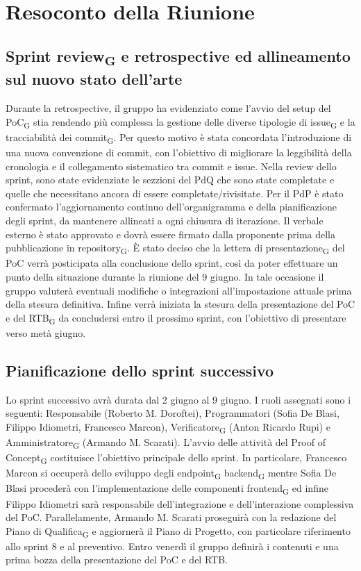\section{Resoconto della Riunione}

\subsection{Sprint review\textsubscript{G} e retrospective ed allineamento sul nuovo stato dell'arte}
Durante la retrospective, il gruppo ha evidenziato 
come l’avvio del setup del PoC\textsubscript{G} stia rendendo più complessa 
la gestione delle diverse tipologie di issue\textsubscript{G} e la 
tracciabilità dei commit\textsubscript{G}. 
Per questo motivo è stata concordata l’introduzione 
di una nuova convenzione di commit, 
con l’obiettivo di migliorare la leggibilità della 
cronologia e il collegamento sistematico tra commit e issue.
Nella review dello sprint,  sono state evidenziate 
le sezzioni del PdQ che sono state completate e 
quelle che necessitano ancora di essere completate/rivisitate. 
Per il PdP è stato confermato l’aggiornamento continuo 
dell’organigramma e della pianificazione degli sprint, 
da mantenere allineati a ogni chiusura di iterazione. 
Il verbale esterno è stato approvato e dovrà essere 
firmato dalla proponente prima della pubblicazione 
in repository\textsubscript{G}.
È stato deciso che la lettera di presentazione\textsubscript{G} del PoC 
verrà posticipata alla conclusione dello sprint, 
così da poter effettuare un punto della situazione 
durante la riunione del 9 giugno. In tale occasione 
il gruppo valuterà eventuali modifiche o integrazioni 
all’impostazione attuale prima della stesura definitiva.
Infine verrà iniziata la stesura della 
presentazione del PoC e del RTB\textsubscript{G} da concludersi entro 
il prossimo sprint, con l’obiettivo di 
presentare verso metà giugno.

\subsection{Pianificazione dello sprint successivo}
Lo sprint successivo avrà durata dal 2 giugno al 9 giugno. 
I ruoli assegnati sono i seguenti: 
Responsabile (Roberto M. Doroftei), 
Programmatori (Sofia De Blasi, Filippo Idiometri, Francesco Marcon), 
Verificatore\textsubscript{G} (Anton Ricardo Rupi) e 
Amministratore\textsubscript{G} (Armando M. Scarati).
L’avvio delle attività del Proof of Concept\textsubscript{G} 
costituisce l’obiettivo principale dello sprint. 
In particolare, Francesco Marcon si occuperà dello 
sviluppo degli endpoint\textsubscript{G} backend\textsubscript{G} mentre Sofia De Blasi 
procederà con l’implementazione delle componenti frontend\textsubscript{G} 
ed infine Filippo Idiometri sarà responsabile 
dell’integrazione e dell’interazione complessiva 
del PoC.
Parallelamente, Armando M. Scarati proseguirà con 
la redazione del Piano di Qualifica\textsubscript{G} e aggiornerà il Piano 
di Progetto, con particolare riferimento allo sprint 8 e 
al preventivo. 
Entro venerdì il gruppo definirà i contenuti 
e una prima bozza della presentazione del PoC e del 
RTB.

